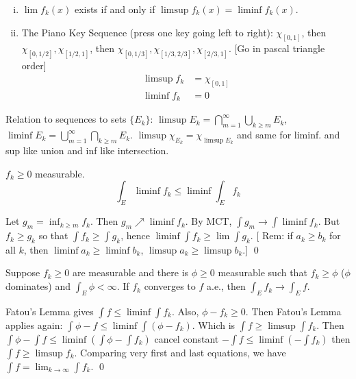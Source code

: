 \begin{ex}
\begin{enumerate}[(i)]
\item $\lim f_k(x)$ exists if and only if $\limsup f_k(x)= \liminf f_k(x)$. 
\item The Piano Key Sequence (press one key going left to right): $\chi_{[0,1]}$, then $\chi_{[0,1/2]}, \chi_{[1/2,1]}$, then $\chi_{[0,1/3]}, \chi_{[1/3,2/3]}, \chi_{[2/3,1]}$. [Go in pascal triangle order]
	\[
	\begin{split}
	\limsup f_k&= \chi_{[0,1]} \\
	\liminf f_k&= 0
	\end{split}
	\]
\end{enumerate}
\end{ex}


\begin{rem}
Relation to sequences to sets $\{E_k\}$: $\limsup E_k= \bigcap_{m=1}^\infty \bigcup_{k \geq m} E_k$, $\liminf E_k= \bigcup_{m=1}^\infty \bigcap_{k \geq m} E_k$. $\limsup \chi_{E_k}= \chi_{\limsup E_k}$ and same for liminf. and sup like union and inf like intersection. 
\end{rem}


\begin{lem}[Fatou]
$f_k \geq 0$ measurable.
\[ \int_E \liminf f_k \leq \liminf \int_E f_k \]
\end{lem}

\pf Let $g_m= \inf_{k \geq m} f_k$. Then $g_m \nearrow \liminf f_k$. By MCT, $\int g_m \to \int \liminf f_k$. But $f_k \geq g_k$ so that $\int f_k \geq \int g_k$, hence $\liminf \int f_k \geq \lim \int g_k$. [ Rem: if $a_k \geq b_k$ for all $k$, then $\liminf a_k \geq \liminf b_k$, $\limsup a_k \geq \limsup b_k$.] \qed \\


\begin{thm}
Suppose $f_k \geq 0$ are measurable and there is $\phi \geq 0$ measurable such that $f_k \geq \phi$ ($\phi$ dominates) and $\int_E \phi< \infty$. If $f_k$ converges to $f$ a.e., then $\int_E f_k \to \int_E f$. 
\end{thm}

\pf Fatou's Lemma gives $\int f \leq \liminf \int f_k$. Also, $\phi - f_k \geq 0$. Then Fatou's Lemma applies again: $\int \phi - f \leq \liminf \int (\phi - f_k)$. Which is $\int f \geq \limsup \int f_k$. Then $\int \phi - \int f \leq \liminf (\int \phi - \int f_k)$ cancel constant $-\int f \leq \liminf (-\int f_k)$ then $\int f \geq \limsup f_k$. Comparing very first and last equations, we have $\int f= \lim_{k \to \infty} \int f_k$. \qed \\





